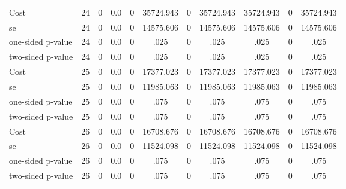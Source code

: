 \begin{tabular}{lcccccccccc}
Cost 			  &        24 &         0 &       0.0 &         0 & 35724.943 & 0 & 35724.943 & 35724.943 & 0 & 35724.943 \\  
se 				 &        24 &         0 &       0.0 &         0 & 14575.606 & 0 & 14575.606 & 14575.606 & 0 & 14575.606 \\  
one-sided p-value&        24 &         0 &       0.0 &         0 & .025 & 0 & .025 & .025 & 0 & .025 \\  
two-sided p-value&        24 &         0 &       0.0 &         0 & .025 & 0 & .025 & .025 & 0 & .025 \\  
Cost 			  &        25 &         0 &       0.0 &         0 & 17377.023 & 0 & 17377.023 & 17377.023 & 0 & 17377.023 \\  
se 				 &        25 &         0 &       0.0 &         0 & 11985.063 & 0 & 11985.063 & 11985.063 & 0 & 11985.063 \\  
one-sided p-value&        25 &         0 &       0.0 &         0 & .075 & 0 & .075 & .075 & 0 & .075 \\  
two-sided p-value&        25 &         0 &       0.0 &         0 & .075 & 0 & .075 & .075 & 0 & .075 \\  
Cost 			  &        26 &         0 &       0.0 &         0 & 16708.676 & 0 & 16708.676 & 16708.676 & 0 & 16708.676 \\  
se 				 &        26 &         0 &       0.0 &         0 & 11524.098 & 0 & 11524.098 & 11524.098 & 0 & 11524.098 \\  
one-sided p-value&        26 &         0 &       0.0 &         0 & .075 & 0 & .075 & .075 & 0 & .075 \\  
two-sided p-value&        26 &         0 &       0.0 &         0 & .075 & 0 & .075 & .075 & 0 & .075 \\  
\hline \hline \end{tabular}

